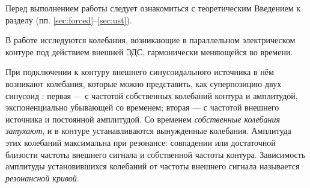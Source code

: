 


Перед выполнением работы следует ознакомиться с теоретическим Введением
к разделу (пп. \ref{sec:forced}--\ref{sec:ust}).

В работе исследуются колебания, возникающие в параллельном электрическом 
контуре под действием внешней ЭДС, гармонически меняющейся во времени.

При подключении к контуру внешнего синусоидального источника в нём 
возникают колебания, которые можно представить, как суперпозицию двух 
синусоид : первая --- с частотой собственных колебаний контура и 
амплитудой, экспоненциально убывающей со временем; вторая --- с частотой 
внешнего источника и постоянной амплитудой. Со временем \emph{собственные 
колебания затухают}, и в контуре устанавливаются вынужденные колебания. 
Амплитуда этих колебаний максимальна при резонансе: совпадении или 
достаточной близости частоты внешнего сигнала и собственной 
частоты контура. Зависимость амплитуды установившихся колебаний от 
частоты внешнего сигнала называется \emph{резонансной кривой}.





